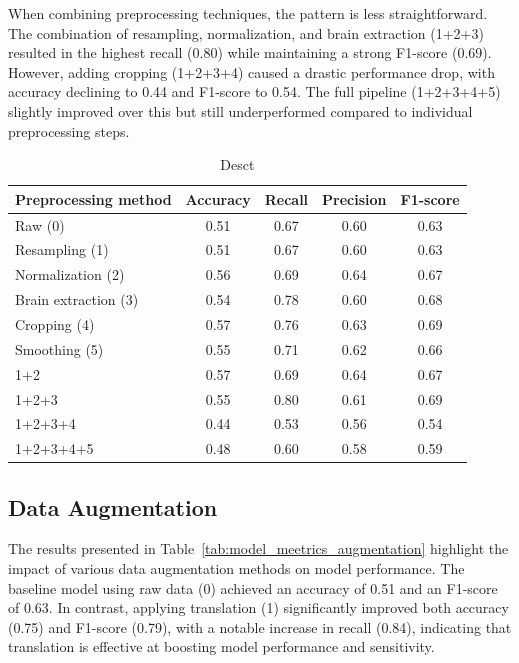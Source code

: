When combining preprocessing techniques, the pattern is less straightforward. The combination of resampling, normalization, and brain extraction (1+2+3) resulted in the highest recall (0.80) while maintaining a strong F1-score (0.69). However, adding cropping (1+2+3+4) caused a drastic performance drop, with accuracy declining to 0.44 and F1-score to 0.54. The full pipeline (1+2+3+4+5) slightly improved over this but still underperformed compared to individual preprocessing steps.
\begin{center}
	\begin{table}[t]
		\centering
		\caption{\label{tab:model_metrics_preprocessing}Desct}
		\begin{tabular*}{500pt}{@{\extracolsep\fill}lcccc@{\extracolsep\fill}}
			\toprule
		     \textbf{Preprocessing method} &\textbf{Accuracy} &  \textbf{Recall} &\textbf{Precision} &\textbf{F1-score}\\
			\midrule
			Raw (0) & 0.51 & 0.67 & 0.60 & 0.63 \\
			Resampling (1) & 0.51 & 0.67 & 0.60 & 0.63 \\
			Normalization (2) & 0.56 & 0.69 & 0.64 & 0.67 \\
			Brain extraction (3) & 0.54 & 0.78 & 0.60 & 0.68 \\
			Cropping (4) & 0.57 & 0.76 & 0.63 & 0.69 \\
			Smoothing (5) & 0.55 & 0.71 & 0.62 & 0.66 \\
            1+2 & 0.57 & 0.69 & 0.64 & 0.67 \\
            1+2+3 & 0.55 & 0.80 & 0.61 & 0.69 \\
            1+2+3+4 & 0.44 & 0.53 & 0.56 & 0.54 \\
            1+2+3+4+5 & 0.48 & 0.60 & 0.58 & 0.59 \\
			\bottomrule
		\end{tabular*}
	\end{table}
\end{center}

\subsection{Data Augmentation}

The results presented in Table~\ref{tab:model_meetrics_augmentation} highlight the impact of various data augmentation methods on model performance. The baseline model using raw data (0) achieved an accuracy of 0.51 and an F1-score of 0.63. In contrast, applying translation (1) significantly improved both accuracy (0.75) and F1-score (0.79), with a notable increase in recall (0.84), indicating that translation is effective at boosting model performance and sensitivity.

